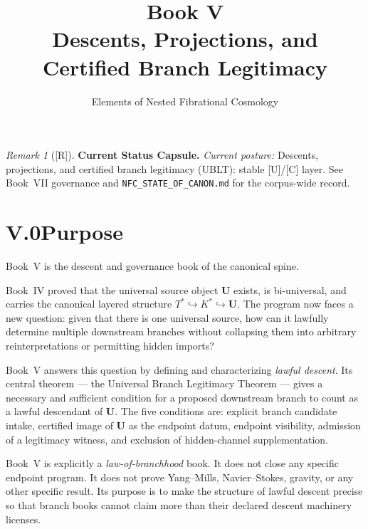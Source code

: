 \documentclass[12pt,oneside]{amsbook}
\theoremstyle{plain}
\theoremstyle{definition}
\theoremstyle{remark}
\newtheorem{remark}[theorem]{Remark}
\newcommand{\status}[1]{\textup{[#1]}}
\begin{document}
\title{Book V\\[6pt]Descents, Projections, and Certified Branch Legitimacy}
\author{Elements of Nested Fibrational Cosmology}
\date{}
\maketitle

\tableofcontents

\bigskip


\begin{remark}[\status{R}]\label{cap:book5-status}
\textbf{Current Status Capsule.} \emph{Current posture:} Descents, projections, and certified branch legitimacy (UBLT): stable [U]/[C] layer. See Book~VII governance and \texttt{NFC\_STATE\_OF\_CANON.md} for the corpus-wide record.
\end{remark}

\section*{V.0\quad Purpose}

Book~V is the descent and governance book of the canonical spine.

Book~IV proved that the universal source object $\mathbf{U}$ exists,
is bi-universal, and carries the canonical layered structure
$T^* \hookrightarrow K^* \hookrightarrow \mathbf{U}$.  The program
now faces a new question: given that there is one universal source,
how can it lawfully determine multiple downstream branches without
collapsing them into arbitrary reinterpretations or permitting hidden
imports?

Book~V answers this question by defining and characterizing
\emph{lawful descent}.  Its central theorem --- the Universal Branch
Legitimacy Theorem --- gives a necessary and sufficient condition for
a proposed downstream branch to count as a lawful descendant of
$\mathbf{U}$.  The five conditions are: explicit branch candidate
intake, certified image of $\mathbf{U}$ as the endpoint datum,
endpoint visibility, admission of a legitimacy witness, and exclusion
of hidden-channel supplementation.

Book~V is explicitly a \emph{law-of-branchhood} book.  It does not
close any specific endpoint program.  It does not prove Yang--Mills,
Navier--Stokes, gravity, or any other specific result.  Its purpose is
to make the structure of lawful descent precise so that branch books
cannot claim more than their declared descent machinery licenses.
\end{document}
